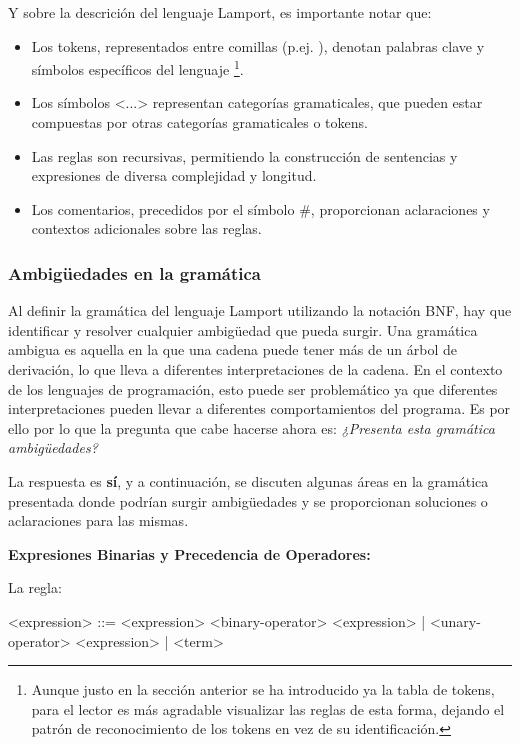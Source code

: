 \noindent
Y sobre la descrición del lenguaje Lamport, es importante notar que:
\begin{itemize}
    \item Los tokens, representados entre comillas (p.ej. ), denotan palabras clave y símbolos específicos del lenguaje \footnote{Aunque justo en la sección anterior se ha introducido ya la tabla de tokens, para el lector es más agradable visualizar las reglas de esta forma, dejando el patrón de reconocimiento de los tokens en vez de su identificación.}.
    \item Los símbolos <...> \hspace{0.05cm} representan categorías gramaticales, que pueden estar compuestas por otras categorías gramaticales o tokens.
    \item Las reglas son recursivas, permitiendo la construcción de sentencias y expresiones de diversa complejidad y longitud.
    \item Los comentarios, precedidos por el símbolo \#, proporcionan aclaraciones y contextos adicionales sobre las reglas.
\end{itemize}

\subsubsection{Ambigüedades en la gramática}\label{subsubsec:gramaticaAmbiguaLamport}
Al definir la gramática del lenguaje Lamport utilizando la notación BNF, hay que identificar y resolver cualquier ambigüedad que pueda surgir. Una gramática ambigua es aquella en la que una cadena puede tener más de un árbol de derivación, lo que lleva a diferentes interpretaciones de la cadena. En el contexto de los lenguajes de programación, esto puede ser problemático ya que diferentes interpretaciones pueden llevar a diferentes comportamientos del programa. Es por ello por lo que la pregunta que cabe hacerse ahora es: \textit{¿Presenta esta gramática ambigüedades?}



La respuesta es \textbf{sí}, y a continuación, se discuten algunas áreas en la gramática presentada donde podrían surgir ambigüedades y se proporcionan soluciones o aclaraciones para las mismas.

\noindent
\textbf{Expresiones Binarias y Precedencia de Operadores:}

\vspace{0.3cm}

\noindent
La regla:
\begin{BNFCode}
<expression> ::= <expression> <binary-operator> <expression>
| <unary-operator> <expression>
| <term>
\end{BNFCode}



